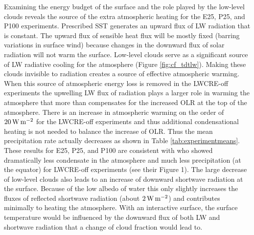 \documentclass[draft]{agujournal2019}
\begin{document}
{Examining the energy budget of the surface and the role played by the low-level clouds
reveals the source of the extra atmospheric heating for the E25, P25, and 
P100 experiments.  
Prescribed SST generates an upward flux of LW radiation that is constant.  
The upward flux of sensible heat flux will be mostly fixed (barring variations in surface
wind) because changes in the downward flux of solar radiation will not warm the surface.  
Low-level clouds serve as a significant source of LW radiative cooling 
for the atmosphere (Figure \ref{fig:cf_tdtlw}).  Making these clouds invisible to radiation creates 
a source of effective atmospheric warming.   When this source of atmospheric energy loss is 
removed in the LWCRE-off experiments the upwelling LW flux of radiation plays a larger 
role in warming the atmosphere that more than compensates for the increased OLR at the 
top of the atmosphere.  There is an increase in atmospheric warming on the order of 
$20 \, \rm{W \,m^{-2}}$ for the LWCRE-off experiments and 
thus additional condensational heating is not needed to balance the increase of OLR. 
Thus the mean precipitation rate actually decreases as shown in Table \ref{tab:experimentmeans}.   
These results for E25, P25, and P100 are consistent with   who 
showed dramatically less condensate in the atmosphere and much less precipitation 
(at the equator) for LWCRE-off experiments (see their Figure 1).  
The large decrease of low-level clouds also leads to an increase of downward shortwave 
radiation at the surface.  Because of the low albedo of water
this only slightly increases the fluxes of reflected shortwave radiation (about $2 \, \rm{W \,m^{-2}}$) 
and contributes minimally to heating the atmosphere.
With an interactive surface, the surface temperature would be influenced
by the downward flux of both LW and shortwave radiation that a change of 
cloud fraction would lead to.   


}
\end{document}
